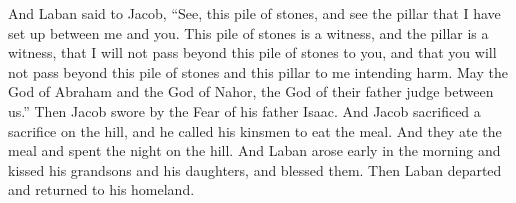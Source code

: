 \begin{biblechapter}
\verse And Laban said to Jacob, “See, this pile of stones, and see the pillar that I have set up between me and you.
\verse This pile of stones is a witness, and the pillar is a witness, that I will not pass beyond this pile of stones to you, and that you will not pass beyond this pile of stones and this pillar to me intending harm.
\verse May the God of Abraham and the God of Nahor, the God of their father judge between us.” Then Jacob swore by the Fear of his father Isaac.
\verse And Jacob sacrificed a sacrifice on the hill, and he called his kinsmen to eat the meal. And they ate the meal and spent the night on the hill.
\verse {} And Laban arose early in the morning and kissed his grandsons and his daughters, and blessed them. Then Laban departed and returned to his homeland.
\end{biblechapter}

